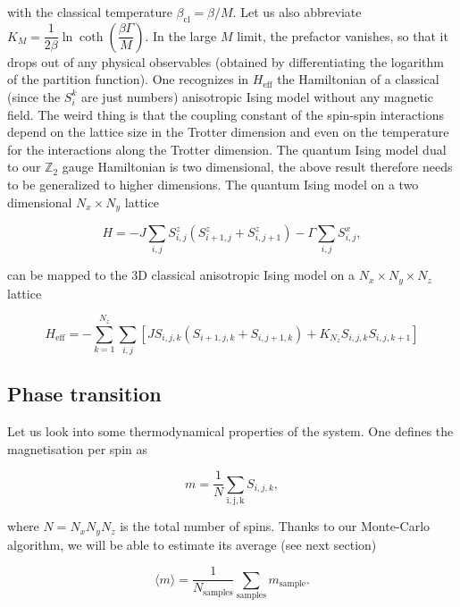 \documentclass[11pt,openany]{article}
\begin{document}
with the classical temperature $\beta_\mathrm{cl} = \beta/M$. Let us also abbreviate $K_M = \dfrac{1}{2\beta}\ln\coth\left(\dfrac{\beta\Gamma}{M}\right)$. In the large $M$ limit, the prefactor vanishes, so that it drops out of any physical observables (obtained by differentiating the logarithm of the partition function). One recognizes in $H_\mathrm{eff}$ the Hamiltonian of a classical (since the $S_i^k$ are just numbers) anisotropic Ising model without any magnetic field. The weird thing is that the coupling constant of the spin-spin interactions depend on the lattice size in the  Trotter dimension and even on the temperature for the interactions along the Trotter dimension. The quantum Ising model dual to our $\mathds{Z}_2$ gauge Hamiltonian is two dimensional, the above result therefore needs to be generalized to higher dimensions. The quantum Ising model on a two dimensional $N_x\times N_y$ lattice

\begin{equation}
	H = -J\sum_{i,j}S^z_{i,j}\left(S^z_{i+1,j} + S^z_{i,j+1}\right) -\Gamma\sum_{i,j}S^x_{i,j},
\end{equation}

can be mapped to the 3D classical anisotropic Ising model on a $N_x\times N_y \times N_z$ lattice

\begin{equation}
	H_\mathrm{eff} = -\sum_{k=1}^{N_z}\sum_{i,j}\left[J S_{i,j,k}\left(S_{i+1,j,k} + S_{i,j+1,k}\right) + K_{N_z} S_{i,j,k}S_{i,j,k+1}\right]
\end{equation}


\subsection{Phase transition}

Let us look into some thermodynamical properties of the system. One defines the magnetisation per spin as

\begin{equation}
	m = \frac{1}{N}\sum_\mathrm{i,j,k}S_{i,j,k},
\end{equation}

where $N=N_xN_yN_z$ is the total number of spins. Thanks to our Monte-Carlo algorithm, we will be able to estimate its average (see next section)

\begin{equation}
	\langle m\rangle = \frac{1}{N_\mathrm{samples}}\sum_\mathrm{samples} m_\mathrm{sample}.
\end{equation}
\end{document}
